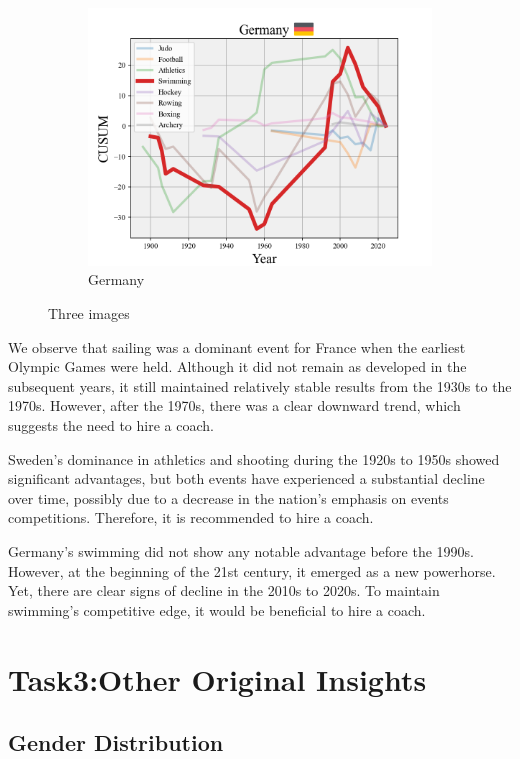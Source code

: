 \documentclass[12pt]{article}  %
\begin{document}
\begin{figure}[H]
\begin{subfigure}[b]{.32\textwidth}
		\includegraphics[width=\textwidth]{img/Decline3.png}
		\caption{Germany}\label{subfig:3}
	\end{subfigure}
	\caption{Three images}\label{fig:subfigures}
\end{figure}

We observe that sailing was a dominant event for France when the earliest Olympic Games were held. Although it did not remain as developed in the subsequent years, it still maintained relatively stable results from the 1930s to the 1970s. However, after the 1970s, there was a clear downward trend, which suggests the need to hire a coach.

Sweden's dominance in athletics and shooting during the 1920s to 1950s showed significant advantages, but both events have experienced a substantial decline over time, possibly due to a decrease in the nation's emphasis on events competitions. Therefore, it is recommended to hire a coach.

Germany’s swimming did not show any notable advantage before the 1990s. However, at the beginning of the 21st century, it emerged as a new powerhorse. Yet, there are clear signs of decline in the 2010s to 2020s. To maintain swimming’s competitive edge, it would be beneficial to hire a coach.



\section{Task3:Other Original Insights}

\subsection{Gender Distribution}
\end{document}
